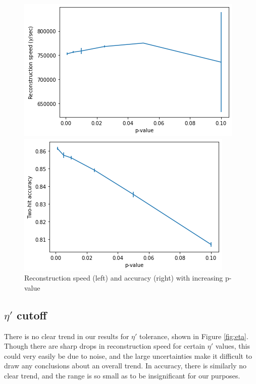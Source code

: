 \begin{figure}
    \centering
    \begin{minipage}{0.49\textwidth} \centering
        \includegraphics[width=\textwidth]{graphs/pi_p_speed.png}
        \end{minipage}
        \begin{minipage}{0.49\textwidth} \centering
        \includegraphics[width=\textwidth]{graphs/pi_p_acc.png}
        \end{minipage}
        \caption{Reconstruction speed (left) and accuracy (right) with increasing p-value}
        \label{fig:p_val}
\end{figure}

\subsection*{$\eta'$ cutoff}
There is no clear trend in our results for $\eta'$ tolerance, shown in Figure \ref{fig:eta}. Though there are sharp drops in reconstruction speed for certain $\eta'$ values, this could very easily be due to noise, and the large uncertainties make it difficult to draw any conclusions about an overall trend. In accuracy, there is similarly no clear trend, and the range is so small as to be insignificant for our purposes.

